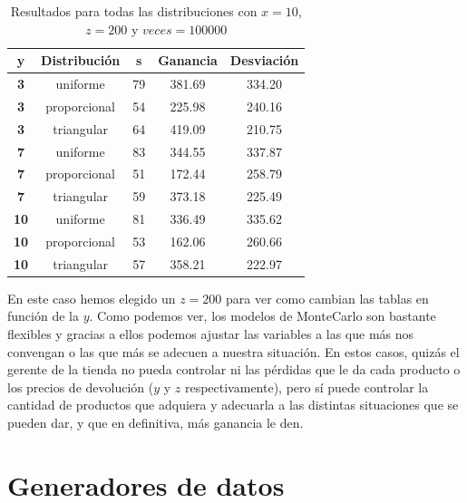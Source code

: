 \documentclass[11pt,a4paper]{report}
\begin{document}
\begin{table}[H]
	\centering
	\begin{tabular}{c|cccc}
	\textbf{\hspace{5mm}y\hspace{5mm}}   & \textbf{Distribución} & \textbf{\hspace{5mm}s\hspace{5mm}} & \textbf{Ganancia} & \textbf{Desviación} \\ \hline
	\textbf{3} & uniforme 			 	 & 79         & 381.69            & 334.20 			  \\
	\textbf{3} & proporcional			 & 54         & 225.98            & 240.16			  \\
	\textbf{3} & triangular 			 & 64         & 419.09            & 210.75			  \\ \hline
	\textbf{7} & uniforme 			 	 & 83         & 344.55            & 337.87 			  \\
	\textbf{7} & proporcional		     & 51         & 172.44            & 258.79			  \\
	\textbf{7} & triangular 		     & 59         & 373.18            & 225.49			  \\ \hline
	\textbf{10} & uniforme 				 & 81         & 336.49            & 335.62 			  \\
	\textbf{10} & proporcional			 & 53         & 162.06            & 260.66			  \\
	\textbf{10} & triangular 		     & 57         & 358.21            & 222.97			  \\
	\end{tabular}
	\caption{Resultados para todas las distribuciones con $x=10$, $z=200$ y $veces=100000$}
\end{table}

En este caso hemos elegido un $z=200$ para ver como cambian las tablas en función de la $y$. Como podemos ver, los modelos de MonteCarlo son bastante flexibles
y gracias a ellos podemos ajustar las variables a las que más nos convengan o las que más se adecuen a nuestra situación. En estos casos, quizás el gerente
de la tienda no pueda controlar ni las pérdidas que le da cada producto o los precios de devolución ($y$ y $z$ respectivamente), pero sí puede controlar la
cantidad de productos que adquiera y adecuarla a las distintas situaciones que se pueden dar, y que en definitiva, más ganancia le den.




\chapter{Generadores de datos}
\end{document}
